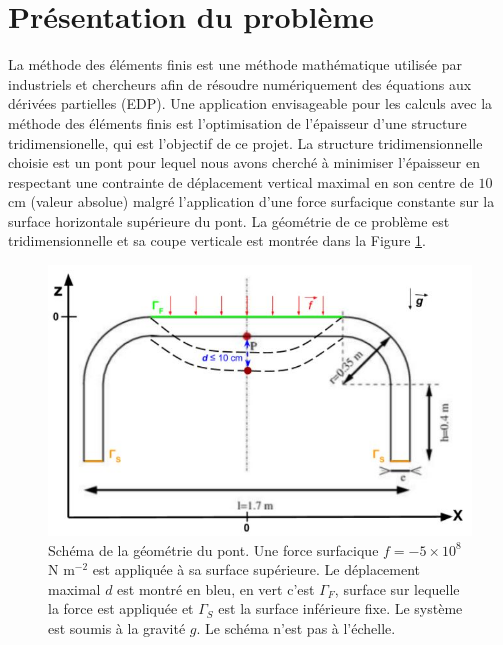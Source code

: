\documentclass{article}
\begin{document}


    \section{Présentation du problème}
    La méthode des éléments finis est une méthode mathématique utilisée par industriels et chercheurs 
    afin de résoudre numériquement des équations aux dérivées partielles (EDP). 
    Une application envisageable pour les calculs avec la méthode des éléments finis est l'optimisation de l'épaisseur d'une structure tridimensionelle, 
    qui est l'objectif de ce projet. 
    La structure tridimensionnelle choisie est un pont pour lequel nous avons cherché à minimiser l'épaisseur
    en respectant une contrainte de déplacement vertical maximal en son centre de $10$ cm (valeur absolue) malgré l'application d'une force surfacique
    constante sur la surface horizontale supérieure du pont. 
    La géométrie de ce problème est tridimensionnelle et sa coupe verticale est montrée dans la Figure \ref{fig:problem}.
    \begin{figure}[H]        
    \begin{center}
	
        \includegraphics[width=12cm]{imgs/coupe_2D-schema.JPG}
        \caption{Schéma de la géométrie du pont. Une force surfacique $f= - 5\times10^8$ N m$^{-2}$ est appliquée à sa surface supérieure. 
        Le déplacement maximal $d$ est montré en bleu, en vert c'est $\Gamma_F$, surface sur lequelle la force est appliquée et $\Gamma_S$ est la surface inférieure fixe. 
        Le système est soumis à la gravité $g$.
        Le schéma n'est pas à l'échelle.}
        \label{fig:problem}
    
	\end{center}
    \end{figure}
    
\end{document}
